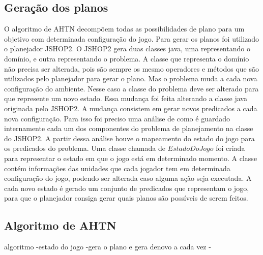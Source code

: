 \subsection{Geração dos planos}

O algoritmo de AHTN decompõem todas as possibilidades de plano para um objetivo com determinada configuração do jogo.
Para gerar os planos foi utilizado o planejador JSHOP2.
O JSHOP2 gera duas classes java, uma representando o domínio, e outra representando o problema.
A classe que representa o domínio não precisa ser alterada, pois são sempre os mesmo operadores e métodos que são utilizados pelo planejador para gerar o plano.
Mas o problema muda a cada nova configuração do ambiente.
Nesse caso a classe do problema deve ser alterado para que represente um novo estado.
Essa mudança foi feita alterando a classe java originada pelo JSHOP2. 
A mudança consistem em gerar novos predicados a cada nova configuração.
Para isso foi preciso uma análise de como é guardado internamente cada um dos componentes do problema de planejamento na classe do JSHOP2.
A partir dessa análise houve o mapeamento do estado do jogo para os predicados do problema.
Uma classe chamada de $EstadoDoJogo$ foi criada para representar o estado em que o jogo está em determinado momento.
A classe contém informações das unidades que cada jogador tem em determinada configuração do jogo, podendo ser alterada caso alguma ação seja executada.
A cada novo estado é gerado um conjunto de predicados que representam o jogo, para que o planejador consiga gerar quais planos são possíveis de serem feitos.

\subsection{Algoritmo de AHTN}

algoritmo
	-estado do jogo
	-gera o plano e gera denovo a cada vez
	-

	
